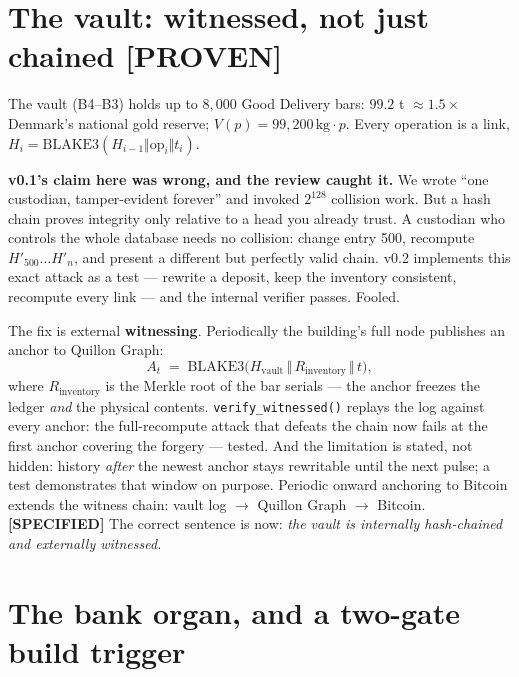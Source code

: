 \documentclass[11pt,a4paper]{article}
\newcommand{\claim}[1]{\textcolor{qsteel}{\textbf{\footnotesize[#1]}}}
\begin{document}
\section{The vault: witnessed, not just chained \hfill \claim{PROVEN}}

The vault (B4--B3) holds up to $8{,}000$ Good Delivery bars:
$99.2$ t $\approx 1.5\times$ Denmark's national gold reserve;
$V(p) = 99{,}200\,\text{kg} \cdot p$. Every operation is a link,
$H_i = \mathrm{BLAKE3}(H_{i-1} \Vert \mathrm{op}_i \Vert t_i)$.

\textbf{v0.1's claim here was wrong, and the review caught it.} We wrote ``one
custodian, tamper-evident forever'' and invoked $2^{128}$ collision work. But a
hash chain proves integrity only relative to a head you already trust. A custodian
who controls the whole database needs no collision: change entry 500, recompute
$H'_{500} \ldots H'_n$, and present a different but perfectly valid chain. v0.2
implements this exact attack as a test --- rewrite a deposit, keep the inventory
consistent, recompute every link --- and the internal verifier passes. Fooled.

The fix is external \textbf{witnessing}. Periodically the building's full node
publishes an anchor to Quillon Graph:
\[
A_t \;=\; \mathrm{BLAKE3}\big(H_{\text{vault}} \,\Vert\, R_{\text{inventory}}
\,\Vert\, t\big),
\]
where $R_{\text{inventory}}$ is the Merkle root of the bar serials --- the anchor
freezes the ledger \emph{and} the physical contents. \texttt{verify\_witnessed()}
replays the log against every anchor: the full-recompute attack that defeats the
chain now fails at the first anchor covering the forgery --- tested. And the
limitation is stated, not hidden: history \emph{after} the newest anchor stays
rewritable until the next pulse; a test demonstrates that window on purpose.
Periodic onward anchoring to Bitcoin extends the witness chain:
vault log $\to$ Quillon Graph $\to$ Bitcoin. \claim{SPECIFIED}
The correct sentence is now: \emph{the vault is internally hash-chained and
externally witnessed.}

\section{The bank organ, and a two-gate build trigger}
\end{document}
